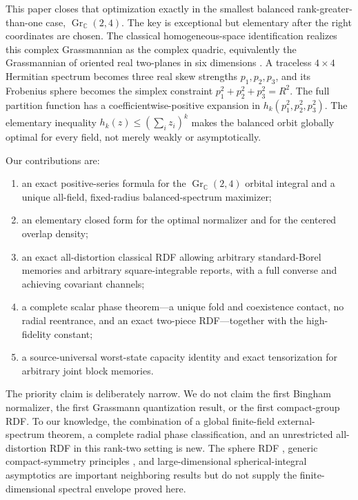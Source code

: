 \documentclass[11pt,a4paper]{article}
\newcommand{\Gr}{\operatorname{Gr}_{\mathbb C}}
\begin{document}
This paper closes that optimization exactly in the smallest balanced rank-greater-than-one case, $\Gr(2,4)$.  The key is exceptional but elementary after the right coordinates are chosen.  The classical homogeneous-space identification realizes this complex Grassmannian as the complex quadric, equivalently the Grassmannian of oriented real two-planes in six dimensions \cite{BenHammoudaKallelSalvatore2013,Klein2008}.  A traceless $4\times4$ Hermitian spectrum becomes three real skew strengths $p_1,p_2,p_3$, and its Frobenius sphere becomes the simplex constraint $p_1^2+p_2^2+p_3^2=R^2$.  The full partition function has a coefficientwise-positive expansion in $h_k(p_1^2,p_2^2,p_3^2)$.  The elementary inequality $h_k(z)\le(\sum_i z_i)^k$ makes the balanced orbit globally optimal for every field, not merely weakly or asymptotically.

Our contributions are:
\begin{enumerate}
\item an exact positive-series formula for the $\Gr(2,4)$ orbital integral and a unique all-field, fixed-radius balanced-spectrum maximizer;
\item an elementary closed form for the optimal normalizer and for the centered overlap density;
\item an exact all-distortion classical RDF allowing arbitrary standard-Borel memories and arbitrary square-integrable reports, with a full converse and achieving covariant channels;
\item a complete scalar phase theorem---a unique fold and coexistence contact, no radial reentrance, and an exact two-piece RDF---together with the high-fidelity constant;
\item a source-universal worst-state capacity identity and exact tensorization for arbitrary joint block memories.
\end{enumerate}
The priority claim is deliberately narrow.  We do not claim the first Bingham normalizer, the first Grassmann quantization result, or the first compact-group RDF.  To our knowledge, the combination of a global finite-field external-spectrum theorem, a complete radial phase classification, and an unrestricted all-distortion RDF in this rank-two setting is new.  The sphere RDF \cite{DytsoCardone2024}, generic compact-symmetry principles \cite{Harremoes2009}, and large-dimensional spherical-integral asymptotics \cite{GuionnetMaida2005,Onatski2014} are important neighboring results but do not supply the finite-dimensional spectral envelope proved here.
\end{document}
